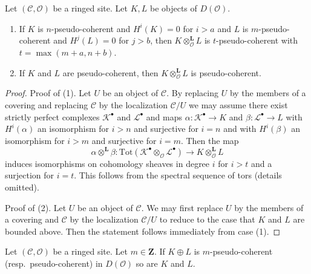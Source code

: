 \begin{lemma}
\label{lemma-tensor-pseudo-coherent}
Let $(\mathcal{C}, \mathcal{O})$ be a ringed site. Let $K, L$ be objects
of $D(\mathcal{O})$.
\begin{enumerate}
\item If $K$ is $n$-pseudo-coherent and $H^i(K) = 0$ for $i > a$
and $L$ is $m$-pseudo-coherent and $H^j(L) = 0$ for $j > b$, then
$K \otimes_\mathcal{O}^\mathbf{L} L$ is $t$-pseudo-coherent
with $t = \max(m + a, n + b)$.
\item If $K$ and $L$ are pseudo-coherent, then
$K \otimes_\mathcal{O}^\mathbf{L} L$ is pseudo-coherent.
\end{enumerate}
\end{lemma}

\begin{proof}
Proof of (1). Let $U$ be an object of $\mathcal{C}$.
By replacing $U$ by the members of a covering
and replacing $\mathcal{C}$ by the localization $\mathcal{C}/U$
we may assume there exist strictly perfect complexes $\mathcal{K}^\bullet$
and $\mathcal{L}^\bullet$ and maps
$\alpha : \mathcal{K}^\bullet \to K$ and
$\beta : \mathcal{L}^\bullet \to L$ with $H^i(\alpha)$ an isomorphism
for $i > n$ and surjective for $i = n$ and with
$H^i(\beta)$ an isomorphism for $i > m$ and surjective for $i = m$.
Then the map
$$
\alpha \otimes^\mathbf{L} \beta :
\text{Tot}(\mathcal{K}^\bullet \otimes_\mathcal{O} \mathcal{L}^\bullet)
\to K \otimes_\mathcal{O}^\mathbf{L} L
$$
induces isomorphisms on cohomology sheaves in degree $i$ for
$i > t$ and a surjection for $i = t$. This follows from the
spectral sequence of tors (details omitted).

\medskip\noindent
Proof of (2). Let $U$ be an object of $\mathcal{C}$.
We may first replace $U$ by the members of a covering
and $\mathcal{C}$ by the localization $\mathcal{C}/U$
to reduce to the case that $K$ and $L$ are bounded above.
Then the statement follows immediately from case (1).
\end{proof}

\begin{lemma}
\label{lemma-summands-pseudo-coherent}
Let $(\mathcal{C}, \mathcal{O})$ be a ringed site. Let $m \in \mathbf{Z}$.
If $K \oplus L$ is $m$-pseudo-coherent (resp.\ pseudo-coherent)
in $D(\mathcal{O})$ so are $K$ and $L$.
\end{lemma}

